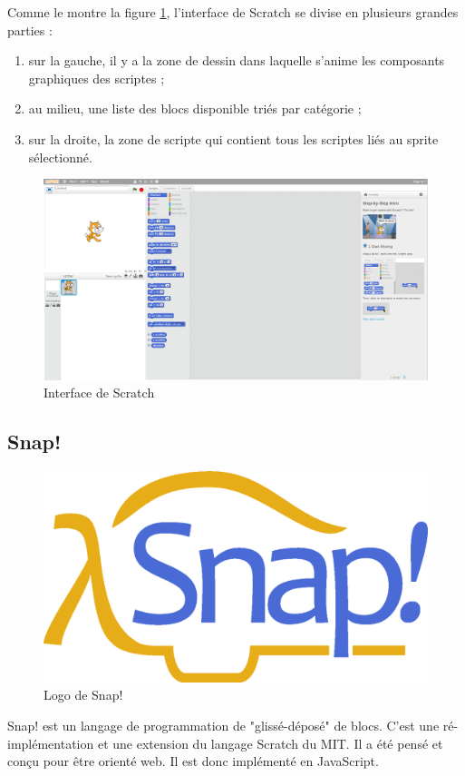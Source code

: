 Comme le montre la figure \ref{fig:scratch-printscreen}, l'interface de Scratch se divise en plusieurs grandes parties :

\begin{enumerate}
\item sur la gauche, il y a la zone de dessin dans laquelle s'anime les composants graphiques des scriptes ;
\item au milieu, une liste des blocs disponible triés par catégorie ;
\item sur la droite, la zone de scripte qui contient tous les scriptes liés au sprite sélectionné.
\end{enumerate}
\begin{figure}[]
  \begin{center}
    \includegraphics[width=\textwidth]{content/5-related_work/images/scratch-printscreen}
    \caption{Interface de Scratch}
    \label{fig:scratch-printscreen}
  \end{center}
\end{figure}

\subsection{Snap!}
\begin{figure}[!h]
  \begin{center}
    \includegraphics[scale=0.07]{content/5-related_work/images/snap}
    \caption{Logo de Snap!}
    \label{fig:snap}
  \end{center}
\end{figure}
Snap! est un langage de programmation de "glissé-déposé" de blocs. C'est une ré-implémentation et une extension du langage Scratch du MIT. Il a été pensé et conçu pour être orienté web. Il est donc implémenté en JavaScript.\\

